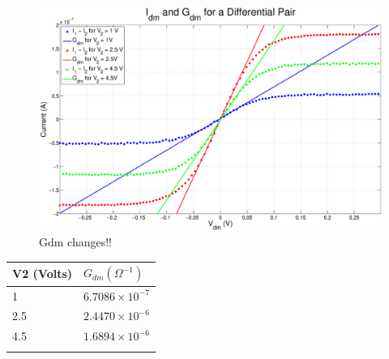 \documentclass{article}
\begin{document}
\begin{figure}[H]
\centering
\includegraphics[width=\linewidth]{./Figures/Gdm.eps}
\caption{Gdm changes!!}
\label{fig:gdm}
\end{figure}

\begin{table}[h]
\begin{center}
    \begin{tabular}{ l | l  }
        V2 (Volts) & $G_{dm} (\Omega^{-1})$ \\
        \hline
        1 & $6.7086 \times 10^{-7}$ \\
        2.5 & $2.4470 \times 10^{-6}$ \\
        4.5 & $1.6894 \times 10^{-6}$ \\
        \label{tb:gdm}
    \end{tabular}
\end{center}
\end{table}



\end{document}
